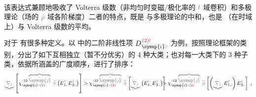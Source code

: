 \begin{subequations}
\begin{align}
\end{align}
\end{subequations}
该表达式兼顾地吸收了 Volterra 级数（非均匀时变磁/极化率的 $\mathcolor{gray}{t}$ 域卷积）和多极理论（场的 $\mathcolor{gray}{\bar{\rho}}$ 域各阶梯度）二者的特点，既是  与多极理论的中和，也是 （在时域上）与 Volterra 级数的平均。

对于  有很多种定义。以  中的二阶非线性项 $D^{\;\! \textcolor{Maroon}{(2)} \mathcolor{gray}{t}}_{\;\! \symup{\iota}\mathcolor{gray}{z}}$ 为例，按照理论框架的类别，分出了如下互相独立（暂不分优劣）的 4 种大类；也对每一大类下的 3 种子类，依据所涵盖的广度顺序，进行了排序：
\begin{subequations}
	\small
\begin{align}
	\mathcolor{gray}{\underbrace{\nabla_{\check{\jmath}}}} \left[ \chi^{\;\! \mathcolor{gray}{t} \hat{1} \hat{2} \;\! \mathcolor{gray}{\overbrace{\check{\symup{\jmath}}}}}_{\;\! \symup{\iota} \mathcolor{gray}{z} \textcolor{Maroon}{(2)}} ~\mathcolor{gray}{\widetilde \circledast} \left( E^{\;\!\mathcolor{gray}{t}}_{\;\! \hat{1} \mathcolor{gray}{z}} E^{\;\!\mathcolor{gray}{t}}_{\;\! \hat{2} \mathcolor{gray}{z}} \right) \right] &> \chi^{\;\! \mathcolor{gray}{t} \hat{1} \hat{2} \;\! \mathcolor{gray}{\overbrace{\check{\symup{\jmath}}}}}_{\;\! \symup{\iota} \mathcolor{gray}{z} \textcolor{Maroon}{(2)}} ~\mathcolor{gray}{\widetilde \circledast} \left[ \mathcolor{gray}{\underbrace{\nabla_{\check{\jmath}}}} \left( E^{\;\!\mathcolor{gray}{t}}_{\;\! \hat{1} \mathcolor{gray}{z}} E^{\;\!\mathcolor{gray}{t}}_{\;\! \hat{2} \mathcolor{gray}{z}} \right) \right] \hspace{-2em}&&> \chi^{\;\! \mathcolor{gray}{t} \hat{1} \hat{2} \;\! \mathcolor{gray}{\overbrace{\check{\symup{\jmath}}}}}_{\;\! \symup{\iota} \mathcolor{gray}{z} \textcolor{Maroon}{(2)}} ~\mathcolor{gray}{\widetilde \circledast} \left[ \left( \mathcolor{gray}{\underbrace{\nabla_{\check{\jmath}}}} E^{\;\!\mathcolor{gray}{t}}_{\;\! \hat{1} \mathcolor{gray}{z}} \right) E^{\;\!\mathcolor{gray}{t}}_{\;\! \hat{2} \mathcolor{gray}{z}} \right]~, \label{eq:Volterra} \\

\end{align}
\end{subequations}
